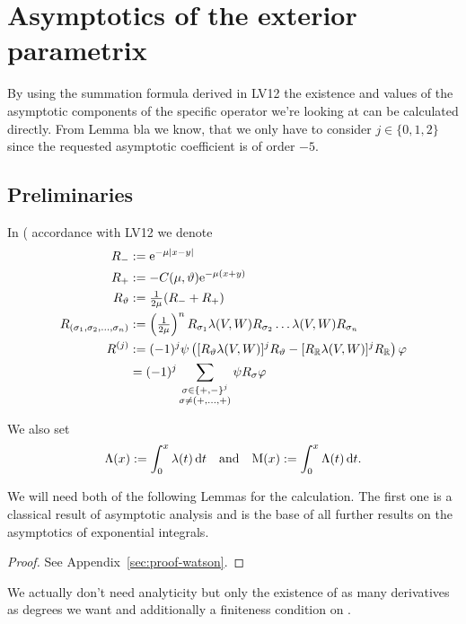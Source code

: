 \section{Asymptotics of the exterior parametrix}
By using the summation formula derived in LV12 the existence and values of the
asymptotic components of the specific operator we're looking at can be
calculated directly. From Lemma bla we know, that we only have to consider $j\in
\{0, 1, 2\}$ since the requested asymptotic coefficient is of order $-5$.

\subsection{Preliminaries}
In (%
accordance with LV12 we denote
\begin{align*}
    R_- &:= \Eto{-\mu\left|x-y\right|} \\
    R_+ &:= -C(\mu,\theta)\Eto{-\mu(x+y)} \\
    R_\theta &:= \tfrac1{2\mu} (R_- + R_+) \\
    R_{(\sigma_1,\sigma_2,\ldots,\sigma_n)} &:= 
    \left(\tfrac1{2\mu}\right)^n R_{\sigma_1} \lambda(V,W) R_{\sigma_2} \dots
    \lambda(V,W) R_{\sigma_n} \\
    R^{(j)} &:= (-1)^j \psi \left( [R_\theta \lambda(V,W)]^j R_\theta -
    [R_\mathbb{R}\lambda(V,W)]^j R_\mathbb{R}\right) \phi \\
            &= (-1)^j
                \sum_{
                        \substack{
                         \sigma\in\{+,-\}^j \\
                         \sigma\neq(+,\ldots,+)
                         }
                        }
                     \psi R_\sigma
                \phi
    \label{<++>}
\end{align*}

We also set
\begin{align}
    \Lambda(x) := \Integ[x]{0}{t}{\lambda(t)}\quad\text{and}\quad
    \mathrm M(x) := \Integ[x]{0}{t}{\Lambda(t)}.
\end{align}

We will need both of the following Lemmas for the calculation. The first one is
a classical result of asymptotic analysis and is the base of all further results
on the asymptotics of exponential integrals.
\begin{Lemma}[Watson]
    
    \begin{proof}
        See Appendix~\ref{sec:proof-watson}.
    \end{proof}
    \begin{Remark}
        We actually don't need analyticity but only the existence of as many
        derivatives as degrees we want and additionally a finiteness condition
        on .
    \end{Remark}
\end{Lemma}

